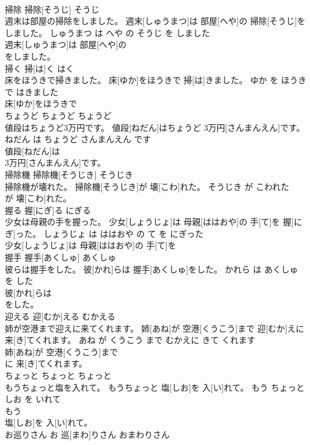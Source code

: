 \documentclass[8pt]{extreport}
\begin{document}
\begin{CJK}{UTF8}{min}
\\	掃除	掃除[そうじ]	そうじ	
\\	週末は部屋の掃除をしました。	週末[しゅうまつ]は 部屋[へや]の 掃除[そうじ]をしました。	しゅうまつ は へや の そうじ を しました	
\\	週末[しゅうまつ]は 部屋[へや]の
\\	をしました。		
\\	掃く	掃[は]く	はく	
\\	床をほうきで掃きました。	床[ゆか]をほうきで 掃[は]きました。	ゆか を ほうき で はきました	
\\	床[ゆか]をほうきで
\\	ちょうど	ちょうど	ちょうど	
\\	値段はちょうど3万円です。	値段[ねだん]はちょうど 3万円[さんまんえん]です。	ねだん は ちょうど さんまんえん です	
\\	値段[ねだん]は
\\	3万円[さんまんえん]です。		
\\	掃除機	掃除機[そうじき]	そうじき	
\\	掃除機が壊れた。	掃除機[そうじき]が 壊[こわ]れた。	そうじき が こわれた	
\\	が 壊[こわ]れた。		
\\	握る	握[にぎ]る	にぎる	
\\	少女は母親の手を握った。	少女[しょうじょ]は 母親[ははおや]の 手[て]を 握[にぎ]った。	しょうじょ は ははおや の て を にぎった	
\\	少女[しょうじょ]は 母親[ははおや]の 手[て]を
\\	握手	握手[あくしゅ]	あくしゅ	
\\	彼らは握手をした。	彼[かれ]らは 握手[あくしゅ]をした。	かれら は あくしゅ を した	
\\	彼[かれ]らは
\\	をした。		
\\	迎える	迎[むか]える	むかえる	
\\	姉が空港まで迎えに来てくれます。	姉[あね]が 空港[くうこう]まで 迎[むか]えに 来[き]てくれます。	あね が くうこう まで むかえに きて くれます	
\\	姉[あね]が 空港[くうこう]まで
\\	に 来[き]てくれます。		
\\	ちょっと	ちょっと	ちょっと	
\\	もうちょっと塩を入れて。	もうちょっと 塩[しお]を 入[い]れて。	もう ちょっと しお を いれて	
\\	もう
\\	塩[しお]を 入[い]れて。		
\\	お巡りさん	お 巡[まわ]りさん	おまわりさん	

\end{CJK}
\end{document}
